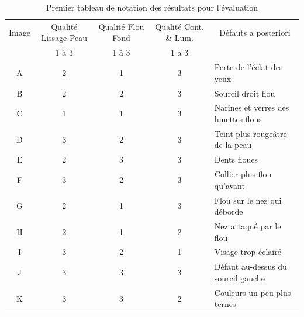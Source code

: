 \documentclass[11pt, french]{report-rd-info}
\begin{document}
\begin{table}[htbp]
\centering
\caption{Premier tableau de notation des résultats pour l'évaluation}
\begin{tabular}{|c|c|c|c|p{3cm}|}
\hline
\multicolumn{ 1}{|c|}{Image} & Qualité Lissage Peau & Qualité Flou Fond & Qualité Cont. \& Lum. & \multicolumn{ 1}{c|}{Défauts a posteriori} \\ \cline{ 2- 4}
\multicolumn{ 1}{|c|}{} & 1 à 3 & 1 à 3 & 1 à 3 & \multicolumn{ 1}{c|}{} \\ \hline
A & 2 & 1 & 3 & Perte de l'éclat des yeux \\ \hline
B & 2 & 2 & 3 & Sourcil droit flou \\ \hline
C & 1 & 1 & 3 & Narines et verres des lunettes flous \\ \hline
D & 3 & 2 & 3 & Teint plus rougeâtre de la peau \\ \hline
E & 2 & 3 & 3 & Dents floues \\ \hline
F & 3 & 2 & 3 & Collier plus flou qu'avant \\ \hline
G & 2 & 1 & 3 & Flou sur le nez qui déborde \\ \hline
H & 2 & 1 & 2 & Nez  attaqué par le flou \\ \hline
I & 3 & 2 & 1 & Visage trop éclairé \\ \hline
J & 3 & 3 & 3 & Défaut au-dessus du sourcil gauche \\ \hline
K & 3 & 3 & 2 & Couleurs un peu plus ternes \\ \hline
\end{tabular}
\label{TableauEvaluation1}
\end{table}
\end{document}
